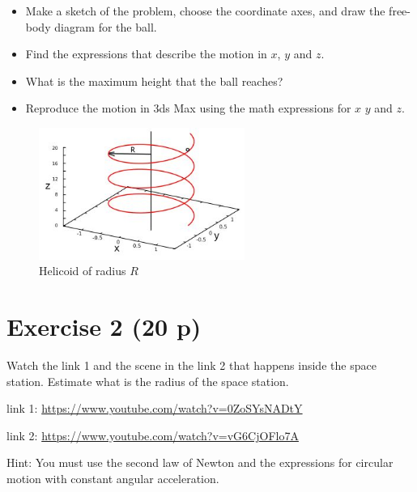 \documentclass[12pt]{article}
\begin{document}
\begin{itemize}
    \item Make a sketch of the problem, choose the coordinate axes, and draw the free-body diagram for
    the ball.
    \item Find the expressions that describe the motion in $x$, $y$ and $z$.
    \item What is the maximum height that the ball reaches?
    \item Reproduce the motion in 3ds Max using the math expressions for $x$ $y$ and $z$.
\end{itemize}

\vspace{3mm}


\begin{figure}[h!] 
    \begin{center} 
    \includegraphics[width=0.6\textwidth]{images/helix.jpg}
    \caption{ Helicoid of radius $R$ }
    \label{image1}
\end{center}
  \end{figure}

  \vspace{5mm}
\section*{Exercise 2 (20 p)}

Watch the link 1 and the scene in the link 2 that happens inside the space station. 
Estimate what is the radius of the space station.
\vspace{3mm}

link 1: \url{https://www.youtube.com/watch?v=0ZoSYsNADtY}

link 2: \url{https://www.youtube.com/watch?v=vG6CjOFlo7A}


\vspace{5mm}
Hint: You must use the second law of Newton and the expressions for circular motion with constant angular acceleration.

\vspace{5mm}
\end{document}
